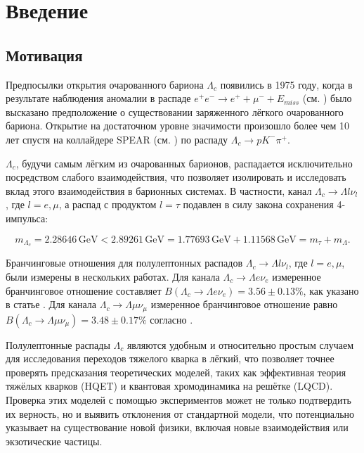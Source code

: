 \section{Введение}

\subsection{Мотивация}

Предпосылки открытия очарованного бариона $\Lambda_c$ появились в 1975 году, когда в результате наблюдения аномалии в распаде $e^+ e^- \to e^+ + \mu^- + E_{miss}$ (см. \textbf{\cite{PhysRevLett1975}}) было высказано предположение о существовании заряженного лёгкого очарованного бариона. Открытие на достаточном уровне значимости произошло более чем 10 лет спустя на коллайдере SPEAR (см. \textbf{\cite{Avery1988}}) по распаду $\Lambda_c \to p K^- \pi^+$. 

$\Lambda_c$, будучи самым лёгким из очарованных барионов, распадается исключительно посредством слабого взаимодействия, что позволяет изолировать и исследовать вклад этого взаимодействия в барионных системах.
В частности, канал $\Lambda_c \rightarrow \Lambda l \nu_l$, где $l = e, \mu$, а распад с продуктом $l = \tau$ подавлен в силу закона сохранения 4-импульса:

\begin{equation*}
    m_{\Lambda_c} = 2.28646\,\text{GeV} < 2.89261\,\text{GeV} = 1.77693\,\text{GeV} + 1.11568\,\text{GeV} = m_{\tau} + m_{\Lambda}.
\end{equation*}

Бранчинговые отношения для полулептонных распадов $\Lambda_c \rightarrow \Lambda l \nu_l$, где $l = e, \mu$, были измерены в нескольких работах. Для канала $\Lambda_c \rightarrow \Lambda e \nu_e$ измеренное бранчинговое отношение составляет $B(\Lambda_c \rightarrow \Lambda e \nu_e) = 3.56 \pm 0.13\%$, как указано в статье \cite{CLEO2023}. Для канала $\Lambda_c \rightarrow \Lambda \mu \nu_{\mu}$ измеренное бранчинговое отношение равно $B(\Lambda_c \rightarrow \Lambda \mu \nu_{\mu}) = 3.48 \pm 0.17\%$ согласно \cite{CLEO2023}.

Полулептонные распады $\Lambda_c$ являются удобным и относительно простым случаем для исследования переходов тяжелого кварка в лёгкий, что позволяет точнее проверять предсказания теоретических моделей, таких как эффективная теория тяжёлых кварков (HQET) и квантовая хромодинамика на решётке (LQCD). Проверка этих моделей с помощью экспериментов может не только подтвердить их верность, но и выявить отклонения от стандартной модели, что потенциально указывает на существование новой физики, включая новые взаимодействия или экзотические частицы.

